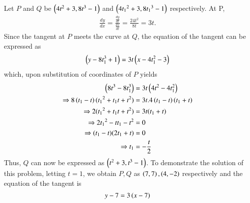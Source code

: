 Let $P$ and $Q$ be $\left(4t ^{ 2 }+3, 8 t ^{ 3 }-1\right)$ and 
 $\left(4{ { t }_{ 1 } }^{ 2 }+3, 8  {t _{ 1 }} ^ 3 -1\right)$  respectively.
 At P, 
 \begin{align}
 \frac { dy }{ dx } = \frac { \frac { dy }{ dt } }{ \frac { dx }{ dt } }=\frac{24t^2}{8t}= 3t .
 \end{align}
 Since the tangent at $P$ meets the curve at $Q$, the equation of the tangent can be expressed as
 \begin{align}
 \left(y - 8t_1^3 +1\right) = 3t\left(x - 4t_1^2 - 3\right)
 \end{align}
 which, upon substitution of coordinates of $P$ yields
%
 \begin{align}
 \left(8t^3 - 8t_1^3 \right) &= 3t\left(4t^2 - 4t_1^2 \right)
 \\
\Rightarrow 8\left(t_1 - t\right)({ { t }_{ 1 } }^{ 2 } + { t }_{ 1 } t + t^2) &= 3t. 4\left({ t }_{ 1 }  -t\right) \left({ t }_{ 1 }  + t \right) \nonumber
\\ 
\Rightarrow 2({ { t }_{ 1 } }^{ 2 }+ { { t }_{ 1 } }t + t^2) &= 3t({ t }_{ 1 }  + t)
 \\ 
\Rightarrow  2{ { t }_{ 1 } }^{ 2 } - t{ { t }_{ 1 } } - t^2 &= 0
\\
\Rightarrow  ({ t }_{ 1 }  - t) (2{ t }_{ 1 }  + t) &= 0
\\
 \Rightarrow  { t }_{ 1 } &= -\frac { t }{ 2 }
 \end{align}
Thus, $Q$ can now be expressed as  $\left(t^{ 2 }+3, t ^ 3 -1\right)$.  To demonstrate the solution of this problem, letting $t = 1$, we obtain $P,Q$ as $\left(7,7\right),\left(4,-2\right)$ respectively and the equation of the tangent is
%
\begin{align}
y-7 = 3\left(x - 7\right)
\end{align}
%

